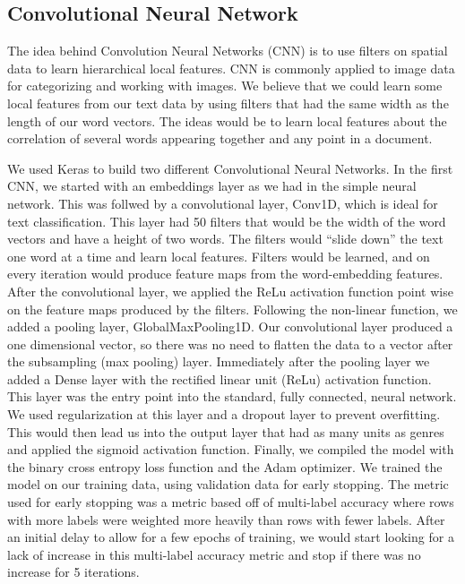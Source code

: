 \documentclass[sigconf]{acmart}
\begin{document}
\subsection{Convolutional Neural Network}
The idea behind Convolution Neural Networks (CNN) is to use filters on spatial data to learn hierarchical local features. CNN is commonly applied to image data for categorizing and working with images. We believe that we could learn some local features from our text data by using filters that had the same width as the length of our word vectors.  The ideas would be to learn local features about the correlation of several words appearing together and any point in a document.

We used Keras to build two different Convolutional Neural Networks.  In the first CNN, we started with an embeddings layer as we had in the simple neural network.  This was follwed by a convolutional layer, Conv1D, which is ideal for text classification. This layer had 50 filters that would be the width of the word vectors and have a height of two words.  The filters would ``slide down'' the text one word at a time and learn local features.  Filters would be learned, and on every iteration would produce feature maps from the word-embedding features. After the convolutional layer, we applied the ReLu activation function point wise on the feature maps produced by the filters.  Following the non-linear function, we added a pooling layer, GlobalMaxPooling1D. Our convolutional layer produced a one dimensional vector, so there was no need to flatten the data to a vector after the subsampling (max pooling) layer. Immediately after the pooling layer we added a Dense layer with the rectified linear unit (ReLu) activation function.  This layer was the entry point into the standard, fully connected, neural network. We used regularization at this layer and a dropout layer to prevent overfitting.  This would then lead us into the output layer that had as many units as genres and applied the sigmoid activation function. Finally, we compiled the model with the binary cross entropy loss function and the Adam optimizer. We trained the model on our training data, using validation data for early stopping.  The metric used for early stopping was a metric based off of multi-label accuracy where rows with more labels were weighted more heavily than rows with fewer labels. After an initial delay to allow for a few epochs of training, we would start looking for a lack of increase in this multi-label accuracy metric and stop if there was no increase for 5 iterations. 
\end{document}

